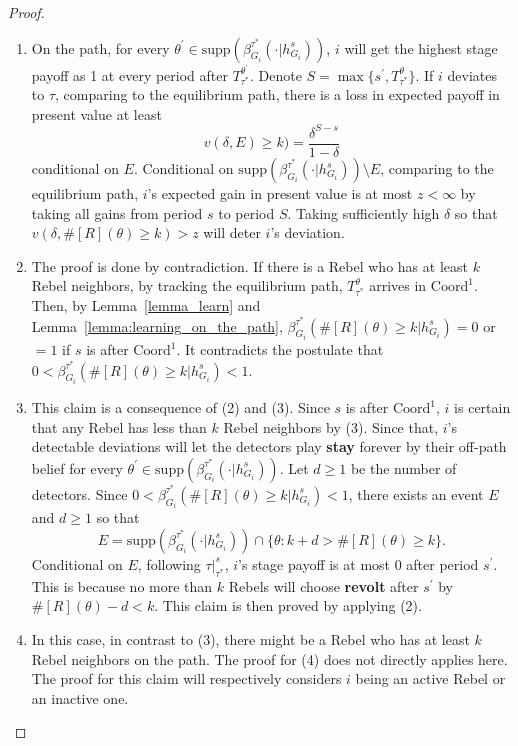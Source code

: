 \documentclass[12pt,letter]{article}
\newcommand{\Kappa}{\mathrm{Coord}}
\theoremstyle{definition}
\theoremstyle{remark}
\theoremstyle{claim}
\begin{document}
\begin{proof}
\begin{enumerate}[label=(\arabic*)]
\item On the path, for every $\theta^{'}\in \mathrm{supp}(\beta^{\tau^{*}}_{G_i}(\cdot |h^s_{G_i}))$, $i$ will get the highest stage payoff as 1 at every period after $T^{\theta^{'}}_{\tau^{*}}$. Denote $S=\max\{s^{'}, T^{\theta}_{\tau^{*}}\}$. If $i$ deviates to $\tau$, comparing to the equilibrium path, there is a loss in expected payoff in present value at least 
\[v(\delta, E)\geq k)=\frac{\delta^{S-s}}{1-\delta}\] 
conditional on $E$. Conditional on $\mathrm{supp}(\beta^{\tau^{*}}_{G_i}(\cdot |h^s_{G_i}))\setminus E$, comparing to the equilibrium path, $i$'s expected gain in present value is at most $z<\infty$ by taking all gains from period $s$ to period $S$. Taking sufficiently high $\delta$ so that $v(\delta, \#[R](\theta)\geq k)>z$ will deter $i$'s deviation.
\item The proof is done by contradiction. If there is a Rebel who has at least $k$ Rebel neighbors, by tracking the equilibrium path, $T^{\theta}_{\tau^{*}}$ arrives in $\Kappa^1$. Then, by Lemma~\ref{lemma_learn} and Lemma~\ref{lemma:learning_on_the_path}, $\beta^{\tau^{*}}_{G_i}(\#[R](\theta)\geq k|h^s_{G_i})=0$ or $=1$ if $s$ is after $\Kappa^1$. It contradicts the postulate that $0<\beta^{\tau^{*}}_{G_i}(\#[R](\theta)\geq k|h^s_{G_i})<1$.
\item This claim is a consequence of (2) and (3). Since $s$ is after $\Kappa^1$, $i$ is certain that any Rebel has less than $k$ Rebel neighbors by (3). Since that, $i$'s detectable deviations will let the detectors play \textbf{stay} forever by their off-path belief for every $\theta^{'}\in \mathrm{supp}(\beta^{\tau^{*}}_{G_i}(\cdot |h^s_{G_i}))$. Let $d\geq 1$ be the number of detectors. Since $0<\beta^{\tau^{*}}_{G_i}(\#[R](\theta)\geq k|h^s_{G_i})<1$, there exists an event $E$ and $d\geq 1$ so that
\[E=\mathrm{supp}(\beta^{\tau^{*}}_{G_i}(\cdot |h^s_{G_i}))\cap \{\theta:k+d>\#[R](\theta)\geq k\}.\] 
Conditional on $E$, following $\tau|^s_{\tau^{*}}$, $i$'s stage payoff is at most 0 after period $s^{'}$. This is because no more than $k$ Rebels will choose \textbf{revolt} after $s^{'}$ by $\#[R](\theta)-d<k$. This claim is then proved by applying (2).
\item In this case, in contrast to (3), there might be a Rebel who has at least $k$ Rebel neighbors on the path. The proof for (4) does not directly applies here. The proof for this claim will respectively considers $i$ being an active Rebel or an inactive one. 


\end{enumerate}
\end{proof}
\end{document}
